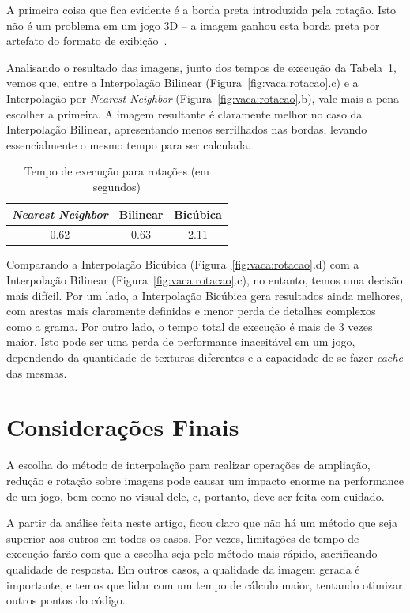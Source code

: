 \documentclass[12pt]{article}
\begin{document}
A primeira coisa que fica evidente é a borda preta introduzida pela rotação. Isto não é um problema em um jogo 3D -- a imagem ganhou esta borda preta por artefato do formato de exibição~\cite{eaton:2008}.

Analisando o resultado das imagens, junto dos tempos de execução da Tabela~\ref{tab:rotacoes}, vemos que, entre a Interpolação Bilinear (Figura~\ref{fig:vaca:rotacao}.c) e a Interpolação por \textit{Nearest Neighbor} (Figura~\ref{fig:vaca:rotacao}.b), vale mais a pena escolher a primeira. A imagem resultante é claramente melhor no caso da Interpolação Bilinear, apresentando menos serrilhados nas bordas, levando essencialmente o mesmo tempo para ser calculada.

\begin{table}[H]
\centering
\begin{tabular}{c|c|c}
 \textit{Nearest Neighbor} & Bilinear & Bicúbica  \\
 \hline
 0.62 & 0.63 & 2.11
\end{tabular}
\caption{Tempo de execução para rotações (em segundos)}
\label{tab:rotacoes}
\end{table}

Comparando a Interpolação Bicúbica (Figura~\ref{fig:vaca:rotacao}.d) com a Interpolação Bilinear (Figura~\ref{fig:vaca:rotacao}.c), no entanto, temos uma decisão mais difícil. Por um lado, a Interpolação Bicúbica gera resultados ainda melhores, com arestas mais claramente definidas e menor perda de detalhes complexos como a grama. Por outro lado, o tempo total de execução é mais de 3 vezes maior. Isto pode ser uma perda de performance inaceitável em um jogo, dependendo da quantidade de texturas diferentes e a capacidade de se fazer \textit{cache} das mesmas.

\section{Considerações Finais}

A escolha do método de interpolação para realizar operações de ampliação, redução e rotação sobre imagens pode causar um impacto enorme na performance de um jogo, bem como no visual dele, e, portanto, deve ser feita com cuidado.

A partir da análise feita neste artigo, ficou claro que não há um método que seja superior aos outros em todos os casos. Por vezes, limitações de tempo de execução farão com que a escolha seja pelo método mais rápido, sacrificando qualidade de resposta. Em outros casos, a qualidade da imagem gerada é importante, e temos que lidar com um tempo de cálculo maior, tentando otimizar outros pontos do código.
\end{document}
